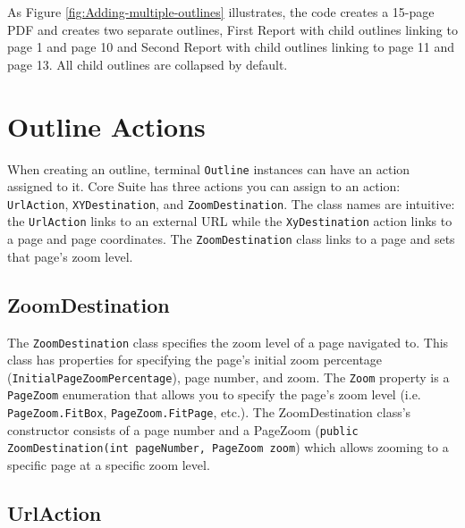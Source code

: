 \documentclass[american,letterpaper]{tufte-book}
\numberwithin{equation}{section}
\numberwithin{figure}{section}
\begin{document}
{As Figure \ref{fig:Adding-multiple-outlines} illustrates, the code
creates a 15-page PDF and creates two separate outlines, \textquotedbl First
Report\textquotedbl{} with child outlines linking to page 1 and page
10 and \textquotedbl Second Report\textquotedbl{} with child outlines
linking to page 11 and page 13. All child outlines are collapsed by
default.

\section{Outline Actions}\label{sec:Outline-Actions}

When creating an outline, terminal \texttt{Outline} instances can have an action
assigned to it. Core Suite has three actions you can assign to an
action: \texttt{UrlAction}, \texttt{XYDestination}, and \texttt{ZoomDestination}. The class names are intuitive: the \texttt{UrlAction} links to an
external URL while the \texttt{XyDestination} action links to a page
and page coordinates. The \texttt{ZoomDestination} class links to
a page and sets that page's zoom level.

\subsection{ZoomDestination}

The \texttt{ZoomDestination} class specifies the zoom level of a page
navigated to. This class has properties for specifying the page's
initial zoom percentage (\texttt{InitialPageZoomPercentage}), page
number, and zoom. The \texttt{Zoom} property is a \texttt{PageZoom}
enumeration that allows you to specify the page's zoom level (i.e.
\texttt{PageZoom.FitBox}, \texttt{PageZoom.FitPage}, etc.). The ZoomDestination
class's constructor consists of a page number and a PageZoom (\texttt{public
ZoomDestination(int pageNumber, PageZoom zoom}) which allows zooming
to a specific page at a specific zoom level.

\subsection{UrlAction}

}
\end{document}
